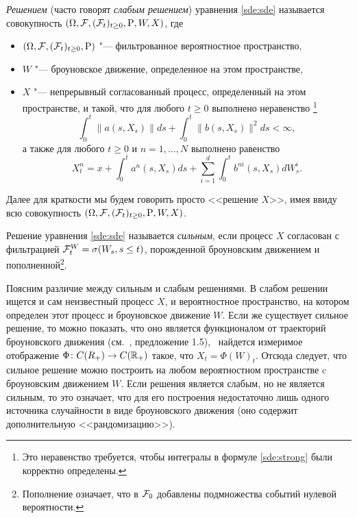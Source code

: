 \begin{definition}
\emph{Решением} (часто говорят \emph{слабым решением}) уравнения \eqref{sde:sde} называется совокупность $(\Omega,\mathcal{F},(\mathcal{F}_t)_{t\ge0},\mathrm{P},W,X)$, где
\begin{itemize}
\item $(\Omega,\mathcal{F},(\mathcal{F}_t)_{t\ge0},\mathrm{P})$ "--- фильтрованное вероятностное пространство,
\item $W$ "--- броуновское движение, определенное на этом пространстве,
\item $X$ "--- непрерывный согласованный процесс, определенный на этом пространстве, и такой, что для любого $t\ge 0$ выполнено неравенство%
\footnote{Это неравенство требуется, чтобы интегралы в формуле \eqref{sde:strong} были корректно определены.}
\begin{equation}
\label{sde:strong-ineq}
\int_0^t \|a(s,X_s)\|ds + \int_0^t \|b(s,X_s)\|^2ds < \infty,
\end{equation}
а также для любого $t\ge 0$ и $n=1,\dots,N$ выполнено равенство
\begin{equation}
\label{sde:strong}
X_t^n = x + \int_0^t a^n(s,X_s)ds + \sum_{i=1}^d\int_0^t b^{ni}(s,X_s)dW_s^i.
\end{equation}
\end{itemize}
\end{definition}

Далее для краткости мы будем говорить просто <<решение $X$>>, имея ввиду всю совокупность $(\Omega,\mathcal{F},(\mathcal{F}_t)_{t\ge0},\mathrm{P},W,X)$.

\begin{definition}
Решение уравнения \eqref{sde:sde} называется \emph{сильным}, если процесс $X$ согласован с фильтрацией $\mathcal{F}_t^W = \sigma(W_s, s\le t)$, порожденной броуновским движением и пополненной\footnote{Пополнение означает, что в $\mathcal{F}_0$ добавлены подмножества событий нулевой вероятности.}.
\end{definition}

Поясним различие между сильным и слабым решениями.
В слабом решении ищется и сам неизвестный процесс $X$, и вероятностное пространство, на котором определен этот процесс и броуновское движение $W$.
Если же существует сильное решение, то можно показать, что оно является функционалом от траекторий броуновского движения (см.\ \cite{ChernyEngelbert}, предложение 1.5), \te\ найдется измеримое отображение $\Phi\colon C(R_+) \to C(\mathbb{R}_+)$ такое, что $X_t = \Phi(W)_t$.
Отсюда следует, что сильное решение можно построить на любом вероятностном пространстве c броуновским движением $W$.
Если решения является слабым, но не является сильным, то это означает, что для его построения недостаточно лишь одного источника случайности в виде броуновского движения (оно содержит дополнительную <<рандомизацию>>).

